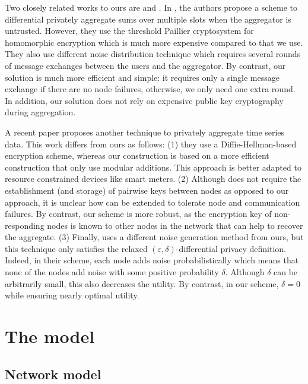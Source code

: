 \documentclass[11pt,a4paper]{article}
\theoremstyle{plain}
\theoremstyle{plain}
\theoremstyle{plain}
\theoremstyle{plain}
\theoremstyle{nonumberplain} \theoremseparator{}
\begin{document}
Two closely related works to ours are \cite{rashtogi10sigmod} and \cite{shi11ndss}.
In \cite{rashtogi10sigmod}, the authors propose a scheme to differential privately aggregate sums over multiple slots when the aggregator is untrusted. However, they use the threshold Paillier cryptosystem \cite{fougue00paillier} for homomorphic encryption which is much more expensive compared to  \cite{cc05mobiquitous} that we use.
They also use different noise distribution technique which requires several rounds of message exchanges between the users and the aggregator. 
By contrast, our solution is much more efficient and simple: it requires only a single message exchange if there are no node failures, otherwise, we only need one extra round. In addition, our solution does not rely on expensive public key cryptography during aggregation.  

A recent paper \cite{shi11ndss} proposes another technique to privately aggregate time series data. This work differs from ours as follows: 
(1) they use a Diffie-Hellman-based encryption scheme, whereas our construction is based on a more efficient construction that only use modular
 additions. This approach is better adapted to resource constrained devices like smart meters.   
(2) Although \cite{shi11ndss} does not require the establishment (and storage) of pairwise keys between nodes as opposed to our approach, 
it is unclear how \cite{shi11ndss} can be extended to tolerate node and communication failures. By contrast, our scheme is more robust, as the encryption key of non-responding nodes is known to other nodes in the network that can help to recover the aggregate. 
(3) Finally, \cite{shi11ndss} uses a different noise generation method from ours, but this technique only satisfies the relaxed $(\varepsilon, \delta)$-differential privacy definition. Indeed, in their scheme, each node adds noise probabilistically which means that none of the nodes add noise with some positive probability $\delta$. Although $\delta$ can be arbitrarily small, this also decreases the utility. By contrast, in our scheme, $\delta=0$ while ensuring nearly optimal utility.

\section{The model}

\subsection{Network model}
\end{document}
